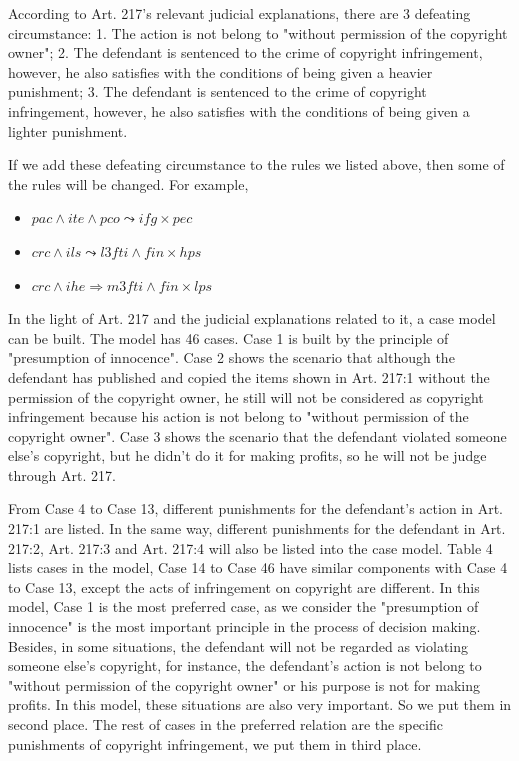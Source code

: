 \documentclass{IOS-Book-Article}
\begin{document}
According to Art. 217's relevant judicial explanations, there are 3 defeating circumstance: 1. The action is not belong to "without permission of the copyright owner"; 2. The defendant is sentenced to the crime of copyright infringement, however, he also satisfies with the conditions of being given a heavier punishment; 3. The defendant is sentenced to the crime of copyright infringement, however, he also satisfies with the conditions of being given a lighter punishment.

If we add these defeating circumstance to the rules we listed above, then some of the rules will be changed. For example,
\begin{itemize}
\item $pac \wedge ite \wedge pco \leadsto ifg \times pec$
\item $crc \wedge ils \leadsto l3fti \wedge fin \times hps$
\item $crc \wedge ihe \Rightarrow m3fti \wedge fin \times lps$
\end{itemize}

In the light of Art. 217 and the judicial explanations related to it, a case model can be built. The model has 46 cases. Case 1 is built by the principle of "presumption of innocence". Case 2 shows the scenario that although the defendant has published and copied the items shown in Art. 217:1 without the permission of the copyright owner, he still will not be considered as copyright infringement because his action is not belong to "without permission of the copyright owner". Case 3 shows the scenario that the defendant violated someone else's copyright, but he didn't do it for making profits, so he will not be judge through Art. 217.

From Case 4 to Case 13, different punishments for the defendant's action in Art. 217:1 are listed. In the same way, different punishments for the defendant in Art. 217:2, Art. 217:3 and Art. 217:4 will also be listed into the case model. Table 4 lists cases in the model, Case 14 to Case 46 have similar components with Case 4 to Case 13, except the acts of infringement on copyright are different. In this model, Case 1 is the most preferred case, as we consider the "presumption of innocence" is the most important principle in the process of decision making. Besides, in some situations, the defendant will not be regarded as violating someone else's copyright, for instance, the defendant's action is not belong to "without permission of the copyright owner" or his purpose is not for making profits. In this model, these situations are also very important. So we put them in second place. The rest of cases in the preferred relation are the specific punishments of copyright infringement, we put them in third place.
\end{document}
